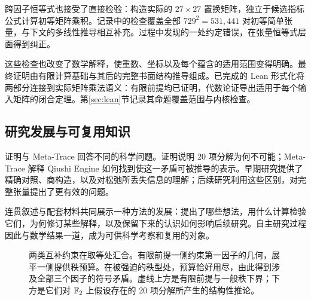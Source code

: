 跨因子恒等式也接受了直接检验：构造实际的 $27\times27$ 置换矩阵，独立于候选指标公式计算初等矩阵乘积。记录中的检查覆盖全部 $729^2=531{,}441$ 对初等简单张量，与下文的多线性推导相互补充。过程中发现的一处约定错误，在张量恒等式层面得到纠正。

这些检查也改变了数学解释，使重数、坐标以及每个蕴含的适用范围变得明确。最终证明由有限计算基础与其后的完整书面结构推导组成。已完成的 Lean 形式化将两部分连接到实际矩阵乘法语义：有限前提均已证明，代数论证导出适用于每个输入矩阵的闭合定理。第\ref{sec:lean}节记录其命题覆盖范围与内核检查。

\subsection{研究发展与可复用知识}

证明与 Meta-Trace 回答不同的科学问题。证明说明 20 项分解为何不可能；Meta-Trace 解释 Qiushi Engine 如何找到使这一矛盾可被推导的表示。早期研究提供了精确对照、商构造，以及对松弛所丢失信息的理解；后续研究利用这些区别，对完整张量提出了更有效的问题。

连贯叙述与配套材料共同展示一种方法的发展：提出了哪些想法，用什么计算检验它们，为何修订某些解释，以及保留下来的认识如何影响后续研究。自主研究过程因此与数学结果一道，成为可供科学考察和复用的对象。

\begin{figure}[tbp]
  \centering
  \makebox[\linewidth][c]{\unskip}
  \caption{两类互补约束在取等处汇合。有限前提一侧约束第一因子的几何，展平一侧提供秩预算。在被强迫的秩型处，预算恰好用尽，由此得到涉及全部三个因子的符号矛盾。虚线上方是有限前提与一般秩下界；下方是它们对 $\mathbb{F}_2$ 上假设存在的 20 项分解所产生的结构性推论。}
  \label{fig:proof-structure}
\end{figure}
\FloatBarrier
